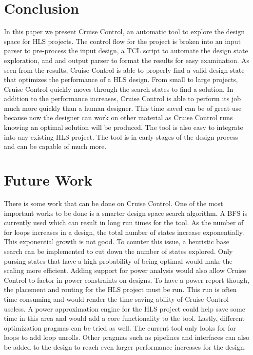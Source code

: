 \documentclass[letterpaper, 10 pt, conference]{IEEEconf}  %
\begin{document}
\section{Conclusion}
In this paper we present Cruise Control, an automatic tool to explore the design space for HLS projects. The control flow for the project is broken into an input parser to pre-process the input design, a TCL script to automate the design state exploration, and and output parser to format the results for easy examination. As seen from the results, Cruise Control is able to properly find a valid design state that optimizes the performance of a HLS design. From small to large projects, Cruise Control quickly moves through the search states to find a solution. In addition to the performance increases, Cruise Control is able to perform its job much more quickly than a human designer. This time saved can be of great use because now the designer can work on other material as Cruise Control runs knowing an optimal solution will be produced. The tool is also easy to integrate into any existing  HLS project. The tool is in early stages of the design process and can be capable of much more. 


\section{Future Work}
There is some work that can be done on Cruise Control. One of the most important works to be done is a smarter design space search algorithm. A BFS is currently used which can result in long run times for the tool. As the number of for loops increases in a design, the total number of states increase exponentially. This exponential growth is not good. To counter this issue, a heuristic base search can be implemented to cut down the number of states explored. Only pursing states that have a high probability of being optimal would make the scaling more efficient. \newline
Adding support for power analysis would also allow Cruise Control to factor in power constraints on designs. To have a power report though, the placement and routing for the HLS project must be run. This run is often time consuming and would render the time saving ability of Cruise Control useless. A power approximation engine for the HLS project  could help save some time in this area and would add a core functionality to the tool. \newline
Lastly, different optimization pragmas can be tried as well. The current tool only looks for for loops to add loop unrolls. Other pragmas such as pipelines and interfaces can also be added to the design to reach even larger performance increases for the design. 
\end{document}
